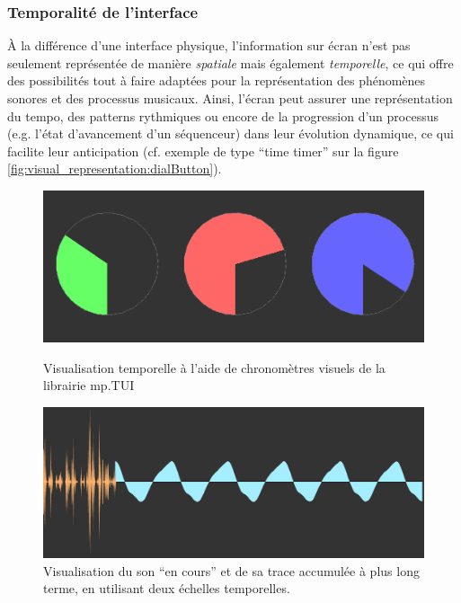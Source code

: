 \subsubsection{Temporalité de l'interface} 

\noindent À la différence d'une interface physique, l'information sur écran n'est pas seulement représentée de manière \textit{spatiale} mais également \textit{temporelle}, ce qui offre des possibilités tout à faire adaptées pour la représentation des phénomènes sonores et des processus musicaux. Ainsi, l'écran peut assurer une représentation du tempo, des patterns rythmiques ou encore de la progression d'un processus (e.g. l'état d'avancement d'un séquenceur) dans leur évolution dynamique, ce qui facilite leur anticipation (cf. exemple de type ``time timer'' sur la figure \ref{fig:visual_representation:dialButton}).\\
\begin{figure}[!htbp]
	\captionsetup{format=plain}%
	\centering
	\begin{minipage}[t]{0.48\textwidth}
		\includegraphics[width=\linewidth]{gfx/06_visual_representation/mpTUI-DialButton.png}
		\caption[Visualisation temporelle à l'aide de chronomètres visuels]{Visualisation temporelle à l'aide de chronomètres visuels de la librairie mp.TUI}
		\label{fig:visual_representation:dialButton}
	\end{minipage}
	\hspace{.02\linewidth}
	\begin{minipage}[t]{0.48\textwidth}
	    \includegraphics[width=\linewidth]{gfx/06_visual_representation/LAM-DSW.png}
		\caption[Deux échelles temporelles différentes d'un flux audio]{Visualisation du son ``en cours'' et de sa trace accumulée à plus long terme, en utilisant deux échelles temporelles.}
		\label{fig:visual_representation:DSW}
	\end{minipage}
\end{figure}
